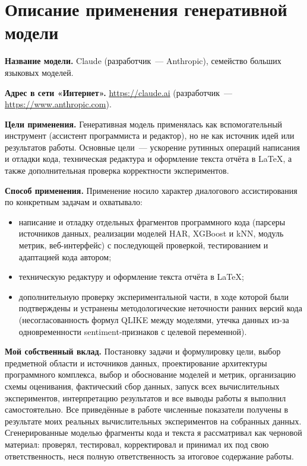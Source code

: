 \section{Описание применения генеративной модели}
\label{sec:genai}

\textbf{Название модели.} Claude (разработчик~--- Anthropic),
семейство больших языковых моделей.

\textbf{Адрес в сети «Интернет».} \url{https://claude.ai}
(разработчик~--- \url{https://www.anthropic.com}).

\textbf{Цели применения.} Генеративная модель применялась как
вспомогательный инструмент (ассистент программиста и редактор), но не как
источник идей или результатов работы. Основные цели~--- ускорение
рутинных операций написания и отладки кода, техническая редактура и
оформление текста отчёта в \LaTeX{}, а также дополнительная проверка
корректности экспериментов.

\textbf{Способ применения.} Применение носило характер диалогового
ассистирования по конкретным задачам и охватывало:

\begin{itemize}
    \item написание и отладку отдельных фрагментов программного кода
          (парсеры источников данных, реализации моделей HAR, XGBoost и
          kNN, модуль метрик, веб-интерфейс) с последующей проверкой,
          тестированием и адаптацией кода автором;
    \item техническую редактуру и оформление текста отчёта в \LaTeX{};
    \item дополнительную проверку экспериментальной части, в ходе которой
          были подтверждены и устранены методологические неточности
          ранних версий кода (несогласованность формул QLIKE между
          моделями, утечка данных из-за одновременности sentiment-признаков
          с целевой переменной).
\end{itemize}

\textbf{Мой собственный вклад.} Постановку задачи и формулировку цели,
выбор предметной области и источников данных, проектирование архитектуры
программного комплекса, выбор и обоснование моделей и метрик, организацию
схемы оценивания, фактический сбор данных, запуск всех вычислительных
экспериментов, интерпретацию результатов и все выводы работы я выполнил
самостоятельно. Все приведённые в работе численные показатели получены
в результате моих реальных вычислительных экспериментов на собранных
данных. Сгенерированные моделью фрагменты кода и текста я рассматривал
как черновой материал: проверял, тестировал, корректировал и принимал их
под свою ответственность, неся полную ответственность за итоговое
содержание работы.
